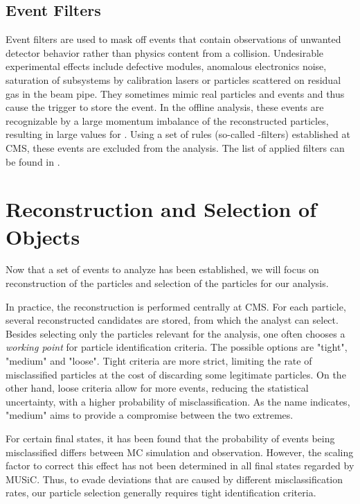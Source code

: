 \subsection{Event Filters}
Event filters are used to mask off events that contain observations of unwanted detector behavior rather than physics content from a collision.
Undesirable experimental effects include defective modules, anomalous electronics noise, saturation of subsystems by calibration lasers or particles scattered on residual gas in the beam pipe. They sometimes mimic real particles and events and thus cause the trigger to store the event. In the offline analysis, these events are recognizable by a large momentum imbalance of the reconstructed particles, resulting in large values for \MET. Using a set of rules (so-called \MET-filters) established at \ac{CMS}, these events are excluded from the analysis. The list of applied filters can be found in \cite[appendix B]{Roemer:ModelUnspecificSearch}.

\section{Reconstruction and Selection of Objects}
Now that a set of events to analyze has been established, we will focus on reconstruction of the particles and selection of the particles for our analysis. 

In practice, the reconstruction is performed centrally at \ac{CMS}. For each particle, several reconstructed candidates are stored, from which the analyst can select. 
Besides selecting only the particles relevant for the analysis, one often chooses a \emph{working point} for particle identification criteria. The possible options are "tight", "medium" and "loose". Tight criteria are more strict, limiting the rate of misclassified particles at the cost of discarding some legitimate particles. On the other hand, loose criteria allow for more events, reducing the statistical uncertainty, with a higher probability of misclassification. As the name indicates, "medium" aims to provide a compromise between the two extremes.

For certain final states, it has been found that the probability of events being misclassified differs between \ac{MC} simulation and observation. However, the scaling factor to correct this effect has not been determined in all final states regarded by \ac{MUSiC}. Thus, to evade deviations that are caused by different misclassification rates, our particle selection generally requires tight identification criteria.

